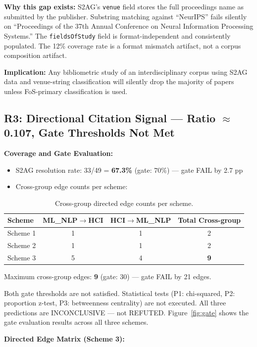 \textbf{Why this gap exists:} S2AG's \texttt{venue} field stores the full proceedings name as submitted by the publisher.
Substring matching against ``NeurIPS'' fails silently on ``Proceedings of the 37th Annual Conference on Neural Information Processing Systems.''
The \texttt{fieldsOfStudy} field is format-independent and consistently populated.
The 12\% coverage rate is a format mismatch artifact, not a corpus composition artifact.

\textbf{Implication:} Any bibliometric study of an interdisciplinary corpus using S2AG data and venue-string classification will silently drop the majority of papers unless FoS-primary classification is used.

\subsection{R3: Directional Citation Signal --- Ratio $\approx$ 0.107, Gate Thresholds Not Met}

\textbf{Coverage and Gate Evaluation:}

\begin{itemize}
\item S2AG resolution rate: 33/49 = \textbf{67.3\%} (gate: 70\%) --- gate FAIL by 2.7 pp
\item Cross-group edge counts per scheme:
\end{itemize}

\begin{table}[h]
\centering
\caption{Cross-group directed edge counts per scheme.}
\label{tab:edges}
\begin{tabular}{lccc}
\toprule
Scheme & ML\_NLP$\to$HCI & HCI$\to$ML\_NLP & Total Cross-group \\
\midrule
Scheme 1 & 1 & 1 & 2 \\
Scheme 2 & 1 & 1 & 2 \\
Scheme 3 & 5 & 4 & \textbf{9} \\
\bottomrule
\end{tabular}
\end{table}

Maximum cross-group edges: \textbf{9} (gate: 30) --- gate FAIL by 21 edges.

Both gate thresholds are not satisfied.
Statistical tests (P1: chi-squared, P2: proportion z-test, P3: betweenness centrality) are not executed.
All three predictions are INCONCLUSIVE --- not REFUTED.
Figure~\ref{fig:gate} shows the gate evaluation results across all three schemes.

\textbf{Directed Edge Matrix (Scheme 3):}

